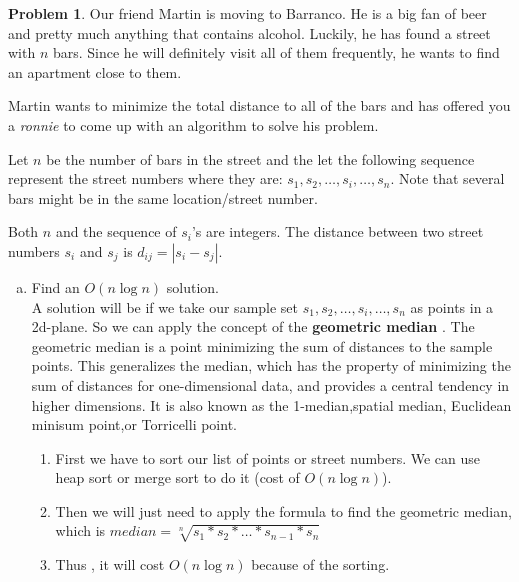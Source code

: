 \documentclass{article}
\theoremstyle{definition}
\newtheorem{problem}{Problem}[section]
\begin{document}
\begin{problem}

    Our friend Martin is moving to Barranco. He is a big fan of beer and pretty much anything that contains alcohol. Luckily, he has found a street with $n$ bars. Since he will definitely visit all of them frequently, he wants to find an apartment close to them. 

\bigbreak\noindent Martin wants to minimize the total distance to all of the bars and has offered you a \textit{ronnie} to come up with an algorithm to solve his problem.

\bigbreak\noindent Let $n$ be the number of bars in the street and the let the following sequence represent the street numbers where they are: $s_1, s_2, \ldots, s_i, \ldots, s_n$. Note that several bars might be in the same location/street number.
    
\bigbreak\noindent Both $n$ and the sequence of $s_i$'s are integers. The distance between two street numbers $s_i$ and $s_j$ is $d_{ij} = |s_i - s_j|$.

    \begin{enumerate}[a)]
        \item Find an $O(n\log n)$ solution.\\
            A solution will be if we take our sample set $s_1, s_2, \ldots, s_i, \ldots, s_n$ as points in a 2d-plane. So we can apply the concept of the \textbf{geometric median} . The geometric median is a point minimizing the sum of distances to the sample  points.
            This generalizes the median, which has the property of minimizing the sum of distances for one-dimensional data, and provides a central tendency in higher dimensions. It is also known as the 1-median,spatial median, Euclidean minisum point,or Torricelli point.
            \begin{enumerate}[1)]
                \item First we have to sort our list of points or street numbers. We can use heap sort or merge sort to do it (cost of $O(n\log n)$).
                \item Then we will just need to apply the formula to find the geometric median, which is $median = \sqrt[n]{s_1*s_2* \ldots* s_{n-1}* s_n}$
                \item Thus , it will cost $O(n\log n)$ because of the sorting.
                

\end{enumerate}
\end{enumerate}
\end{problem}
\end{document}
